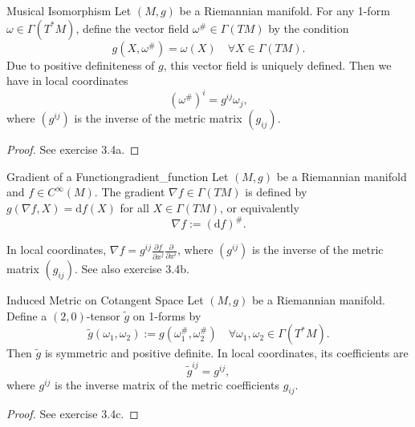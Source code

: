 \begin{colorlem}{Musical Isomorphism}{}
Let $(M, g)$ be a Riemannian manifold. For any 1-form $\omega \in \Gamma(T^*M)$, define the vector field $\omega^\# \in \Gamma(TM)$ by the condition
\[
g(X, \omega^\#) = \omega(X) \quad \forall X \in \Gamma(TM).
\]
Due to positive definiteness of $g$, this vector field is uniquely defined. Then we have in local coordinates
\[
(\omega^\#)^i = g^{ij} \omega_j,
\]
where $(g^{ij})$ is the inverse of the metric matrix $(g_{ij})$.
\end{colorlem}
\begin{proof}
See exercise 3.4a.
\end{proof}


\begin{colordef}{Gradient of a Function}{gradient_function}
Let $(M, g)$ be a Riemannian manifold and $f \in C^\infty(M)$. The gradient $\nabla f \in \Gamma(TM)$ is defined by $g(\nabla f, X) = \mathrm{d}f(X)$ for all $X \in \Gamma(TM)$, or equivalently
$$\nabla f := (\mathrm{d}f)^\# .$$
\end{colordef}
In local coordinates, $\nabla f = g^{ij} \frac{\partial f}{\partial x^j} \frac{\partial}{\partial x^i}$, where $(g^{ij})$ is the inverse of the metric matrix $(g_{ij})$. See also exercise 3.4b.
\begin{colorlem}{Induced Metric on Cotangent Space}{}
Let $(M, g)$ be a Riemannian manifold. Define a $(2, 0)$-tensor $\tilde{g}$ on 1-forms by
\[
\tilde{g}(\omega_1, \omega_2) := g(\omega_1^\#, \omega_2^\#) \quad \forall \omega_1, \omega_2 \in \Gamma(T^*M).
\]
Then $\tilde{g}$ is symmetric and positive definite. In local coordinates, its coefficients are
\[
\tilde{g}^{ij} = g^{ij},
\]
where $g^{ij}$ is the inverse matrix of the metric coefficients $g_{ij}$.
\end{colorlem}
\begin{proof}
See exercise 3.4c.
\end{proof}



